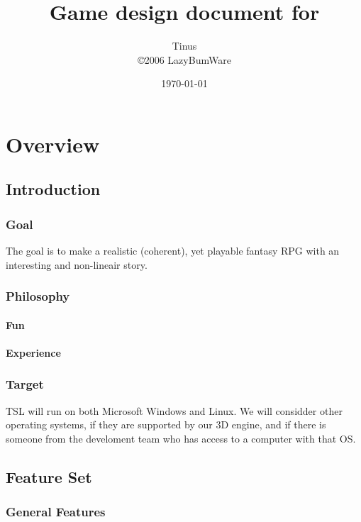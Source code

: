 \documentclass[a4paper]{report}
\title{
	Game design document for \\ 
	\nadruk{The Scattered Lands}
}
\author{
	Tinus \\
	\copyright 2006 LazyBumWare
}
\date{\today}
\begin{document}
\maketitle
\tableofcontents

\part{Overview}

	\chapter{Introduction}

		\section{Goal}

			The goal is to make a realistic (coherent), yet playable fantasy RPG with an interesting and non-lineair story.

		\section{Philosophy}

			\subsection{Fun}

			\subsection{Experience}

		\section{Target}

			TSL will run on both Microsoft Windows and Linux. We will considder other operating systems, if they are supported by our 3D engine, and if there is someone from the develoment team who has access to a computer with that OS.

	\chapter{Feature Set}

		\section{General Features}
\end{document}
